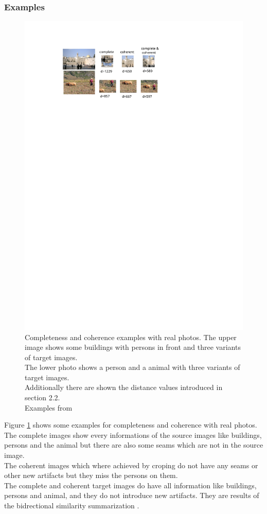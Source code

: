 \subsubsection*{Examples}
\begin{figure}[h]
\centering
\includegraphics[scale=0.9]{img/compcohexample}
\caption[Compcohexample]{Completeness and coherence examples with real photos. The upper image shows some buildings with persons in front and three variants of target images.\\ The lower photo shows a person and a animal with three variants of target images.\\ Additionally there are shown the distance values introduced in section 2.2.\\ Examples from \cite{bisi} }
\label{fig:Compcohexample}
\end{figure}

Figure \ref{fig:Compcohexample} shows some examples for completeness and coherence with real photos. The complete images show every informations of the source images like buildings, persons and the animal but there are also some seams which are not in the source image.\\
The coherent images which where achieved by croping \cite{bisi} do not have any seams or other new artifacts but they miss the persons on them.\\
The complete and coherent target images do have all information like buildings, persons and animal, and they do not introduce new artifacts. They are results of the bidrectional similarity summarization \cite{bisi}.


